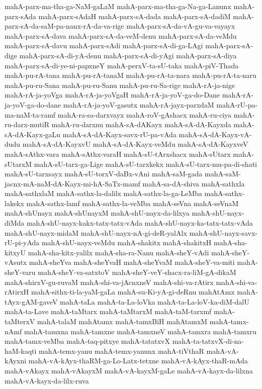 {mahA-parx-ma-tha-ga-NaM-gaLaM
mahA-parx-ma-tha-ga-Na-ga-Lanunx
mahA-parx-sAda
mahA-parx-sAdaH
mahA-parx-sA-dada
mahA-parx-sA-dadiM
mahA-parx-sA-da-saM-pa-nanx-rA-da-va-rige
mahA-parx-sA-da-vA-gu-va-vayayx
mahA-parx-sA-dava
mahA-parx-sA-da-veM-denu
mahA-parx-sA-da-veMdu
mahA-parx-sA-davu
mahA-parx-sAdi
mahA-parx-sA-di-ga-LAgi
mahA-parx-sA-dige
mahA-parx-sA-di-yA-denu
mahA-parx-sA-di-yAgi
mahA-parx-sA-diya
mahA-parx-sA-di-ye-ni-papxneY
mahA-perxV-ta-sU-taka
mahA-piV-Thada
mahA-pu-rA-tana
mahA-pu-rA-tanaM
mahA-pu-rA-ta-nara
mahA-pu-rA-ta-naru
mahA-pu-ru-Sana
mahA-pu-ru-Sanu
mahA-pu-ru-Sa-rige
mahA-rA-ja-nige
mahA-rA-ja-yoVga
mahA-rA-ja-yoVgaH
mahA-rA-ja-yoV-ga-do-Dane
mahA-rA-ja-yoV-ga-do-dane
mahA-rA-ja-yoV-gasutx
mahA-rA-jayx-parxdaM
mahA-rU-pa-ma-naM-ta-ramf
mahA-ra-sa-darxvayx
mahA-roV-gAshacx
mahA-ru-ciya
mahA-ru-darx-mutiR
mahA-ru-darxnu
mahA-sA-dAKayx
mahA-sA-dA-Kayxda
mahA-sA-dA-Kayx-gaLu
mahA-sA-dA-Kayx-savx-rU-pa-vAda
mahA-sA-dA-Kayx-vA-dudu
mahA-sA-dA-KayxvU
mahA-sA-dA-Kayx-veMdu
mahA-sA-dA-KayxveV
mahA-sAthx-vara
mahA-sAthx-varaH
mahA-sU-tArxshacx
mahA-sUtarx
mahA-sUtarxM
mahA-sU-tarx-ga-Lige
mahA-sU-tarxkekx
mahA-sU-tarx-mu-pa-di-shati
mahA-sU-tarxsayx
mahA-sU-torxV-daBx-vAni
mahA-saM-gada
mahA-saM-jacnx-mA-naM-dA-Kayx-mi-hA-SaTx-mamf
mahA-sa-dA-shiva
mahA-sathxla
mahA-sathxlaM
mahA-sathx-la-dalilx
mahA-sathx-la-ga-LeMba
mahA-sathx-lakekx
mahA-sathx-lamf
mahA-sathx-la-veMba
mahA-seVna
mahA-seVnaM
mahA-shUnayx
mahA-shUnayxM
mahA-shU-nayx-da-lilxya
mahA-shU-nayx-diMda
mahA-shU-nayx-kakx-tatx-tatx-vAda
mahA-shU-nayx-ka-tatx-tatx-vAda
mahA-shU-nayx-midaM
mahA-shU-nayx-nA-gi-deR-yalAlx
mahA-shU-nayx-savx-rU-pi-yAda
mahA-shU-nayx-veMdu
mahA-shakitx
mahA-shakitxH
mahA-sha-kitxyU
mahA-sha-kitx-yalilx
mahA-sha-ra-Nanu
mahA-sheY-vAdi
mahA-sheY-vAsutx
mahA-sheYva
mahA-sheYvaH
mahA-sheYvaM
mahA-sheY-va-miti
mahA-sheY-varu
mahA-sheY-va-satxtoV
mahA-sheY-veY-shacx-ra-liM-gA-dikaM
mahA-shirxV-gu-ruvaM
mahA-shi-va-jAcnxneV
mahA-shi-va-rAtirx
mahA-shi-va-rAtirxH
mahA-sithx-ti-la-yaM-gaLa
mahA-su-Ki-yA-gi-deRnu
mahAtAmx
mahA-tAyx-gAM-gaveV
mahA-taLa
mahA-ta-La-loVka
mahA-ta-La-loV-ka-diM-dalU
mahA-ta-Lave
mahA-taMtarx
mahA-taMtarxM
mahA-taM-tarxmf
mahA-taMterxV
mahA-talaM
mahAtamx
mahA-tamxBiH
mahAtamxM
mahA-tamx-nAmf
mahA-tamxna
mahA-tamxne
mahA-tamxneV
mahA-tamxra
mahA-tamxru
mahA-tamx-veMba
mahA-taq-pitxye
mahA-tatatxvX
mahA-ta-tatxvX-di-na-haM-kaqti
mahA-temx-yanu
mahA-temx-yanunx
mahA-tiVthaR
mahA-vA-kAyxni
mahA-vA-kAyx-thaRM-ga-Lo-Latx-tetxne
mahA-vA-kAyx-thaR-mAda
mahA-vAkayx
mahA-vAkayxM
mahA-vA-kayxM-gaLe
mahA-vA-kayx-da-lilxna
mahA-vA-kayx-da-lilx-ruva
}
